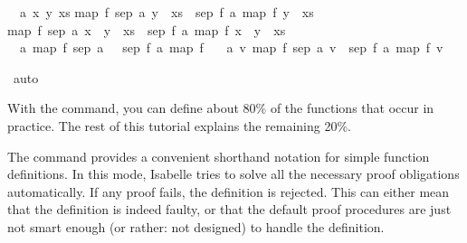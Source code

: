 \begin{isabellebody}
\begin{isamarkuptxt}
  \begin{isabelle}%
\ {}{\isachardot}\ {\isasymAnd}a\ x\ y\ xs{\isachardot}\isanewline
{}map\ f\ {\isacharparenleft}sep\ a\ {\isacharparenleft}y\ {\isacharhash}\ xs{\isacharparenright}{\isacharparenright}\ {\isacharequal}\ sep\ {\isacharparenleft}f\ a{\isacharparenright}\ {\isacharparenleft}map\ f\ {\isacharparenleft}y\ {\isacharhash}\ xs{\isacharparenright}{\isacharparenright}\ {\isasymLongrightarrow}\isanewline
{}map\ f\ {\isacharparenleft}sep\ a\ {\isacharparenleft}x\ {\isacharhash}\ y\ {\isacharhash}\ xs{\isacharparenright}{\isacharparenright}\ {\isacharequal}\ sep\ {\isacharparenleft}f\ a{\isacharparenright}\ {\isacharparenleft}map\ f\ {\isacharparenleft}x\ {\isacharhash}\ y\ {\isacharhash}\ xs{\isacharparenright}{\isacharparenright}\isanewline
\ {}{\isachardot}\ {\isasymAnd}a{\isachardot}\ map\ f\ {\isacharparenleft}sep\ a\ {\isacharbrackleft}{\isacharbrackright}{\isacharparenright}\ {\isacharequal}\ sep\ {\isacharparenleft}f\ a{\isacharparenright}\ {\isacharparenleft}map\ f\ {\isacharbrackleft}{\isacharbrackright}{\isacharparenright}\isanewline
\ {}{\isachardot}\ {\isasymAnd}a\ v{\isachardot}\ map\ f\ {\isacharparenleft}sep\ a\ {\isacharbrackleft}v{\isacharbrackright}{\isacharparenright}\ {\isacharequal}\ sep\ {\isacharparenleft}f\ a{\isacharparenright}\ {\isacharparenleft}map\ f\ {\isacharbrackleft}v{\isacharbrackright}{\isacharparenright}%
\end{isabelle}%
\end{isamarkuptxt}%
\isamarkuptrue%
\isamarkupfalse%
\ auto\ \isanewline
{}\isamarkupfalse%
%
\endisatagproof
{\isafoldproof}%
%
\isadelimproof
%
\endisadelimproof
%
\begin{isamarkuptext}%
With the  command, you can define about 80\% of the
  functions that occur in practice. The rest of this tutorial explains
  the remaining 20\%.%
\end{isamarkuptext}%
\isamarkuptrue%
%
\isamarkuptrue%
%
\begin{isamarkuptext}%
The  command provides a
  convenient shorthand notation for simple function definitions. In
  this mode, Isabelle tries to solve all the necessary proof obligations
  automatically. If any proof fails, the definition is
  rejected. This can either mean that the definition is indeed faulty,
  or that the default proof procedures are just not smart enough (or
  rather: not designed) to handle the definition.


\end{isamarkuptext}
\end{isabellebody}
